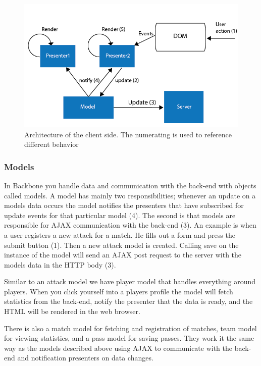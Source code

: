 \begin{figure}[ht!]
\centering
\includegraphics[width=1\textwidth]{images/architecture/backbone_architecture.png}
\caption{Architecture of the client side. The numerating is used to reference different behavior}
\label{fig:backbone_architecture}
\end{figure}

\subsubsection{Models}

In Backbone you handle data and communication with the back-end with objects called models. A model has mainly two responsibilities; whenever an update on a models data occurs the model notifies the presenters that have subscribed for update events for that particular model (4). The second is that models are responsible for \ac{AJAX} communication with the back-end (3). An example is when a user registers a new attack for a match. He fills out a form and press the submit button (1). Then a new attack model is created. Calling save on the instance of the model will send an \ac{AJAX} post request to the server with the models data in the \ac{HTTP} body (3).

Similar to an attack model we have player model that handles everything around players. When you click yourself into a players profile the model will fetch statistics from the back-end, notify the presenter that the data is ready, and the \ac{HTML} will be rendered in the web browser.

There is also a match model for fetching and registration of matches, team model for viewing statistics, and a pass model for saving passes. They work it the same way as the models described above using \ac{AJAX} to communicate with the back-end and notification presenters on data changes.


